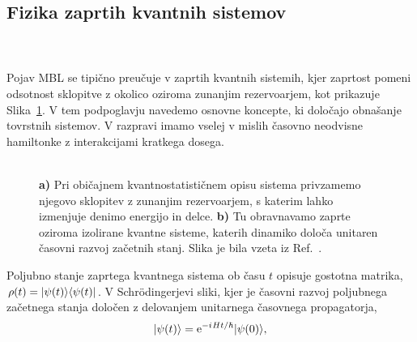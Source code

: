 \subsection{Fizika zaprtih kvantnih sistemov}
\begin{minipage}[t]{0.4\textwidth}
\noindent \\\\
Pojav MBL se tipično preučuje v zaprtih kvantnih sistemih, kjer zaprtost pomeni odsotnost sklopitve z okolico oziroma zunanjim rezervoarjem, kot prikazuje Slika~\ref{fig:nandkishore_huse_reservoir}. V tem podpoglavju navedemo osnovne koncepte, ki določajo obnašanje tovrstnih sistemov. V razpravi imamo vselej v mislih časovno neodvisne hamiltonke z interakcijami kratkega dosega. \\\\
\end{minipage}\hfill
\begin{minipage}[t]{0.55\textwidth}
\begin{figure}[H]
\caption{
\textbf{a)} Pri običajnem kvantnostatističnem opisu sistema privzamemo njegovo sklopitev z zunanjim rezervoarjem, s katerim lahko izmenjuje denimo energijo in delce. \textbf{b)} Tu obravnavamo zaprte oziroma izolirane kvantne sisteme, katerih dinamiko določa unitaren časovni razvoj začetnih stanj. 
Slika je bila vzeta iz Ref.~\cite{nandkishore2015many}. 
}
\label{fig:nandkishore_huse_reservoir}
\end{figure}
\end{minipage}
Poljubno stanje zaprtega kvantnega sistema ob času $t$ opisuje gostotna matrika, $\rho(t)=\vert\psi(t)\rangle\langle \psi(t) \vert$. 
V Schrödingerjevi sliki, kjer je časovni razvoj poljubnega začetnega 
 stanja določen z delovanjem unitarnega časovnega propagatorja, 
\begin{equation}\label{eq:cas_razvoj}
\vert\psi(t)\rangle=\mathrm{e}^{-{i\mkern1mu} H t/\hbar}\vert\psi(0)\rangle,
\end{equation}
